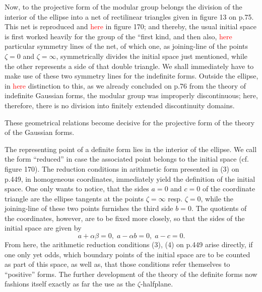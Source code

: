 Now, to the projective form of the modular group belongs the division of the interior of the ellipse into a net of rectilinear triangles given in figure 13 on p.75. This net is reproduced and \textcolor{red}{here} in figure 170; 
and thereby, the usual initial space is first worked heavily for the group of the “first kind, and then also, \textcolor{red}{here} particular symmetry lines of the net, of which one, as joining-line of the points $\zeta=0$ and $\zeta=\infty$, symmetrically divides the initial space just mentioned, while the other represents a side of that double triangle. We shall immediately have to make use of these two symmetry lines for the indefinite forms. Outside the ellipse, in \textcolor{red}{here} distinction to this, as we already concluded on p.76 from the theory of indefinite Gaussian forms, the modular group was improperly discontinuous; here, therefore, there is no division into finitely extended discontinuity domains.

These geometrical relations become decisive for the projective form of the theory of the Gaussian forms. 

The representing point of a definite form lies in the interior of the ellipse. We call the form “reduced” in case the associated point belongs to the initial space (cf. figure 170). The reduction conditions in arithmetic form presented in (3) on p.449, in homogeneous coordinates, immediately yield the definition of the initial space. One only wants to notice, that the sides $a=0$ and $c=0$ of the coordinate triangle are the ellipse tangents at the points $\zeta=\infty$ resp. $\zeta=0$, while the joining-line of these two points furnishes the third side $b=0$. The quotients of the coordinates, however, are to be fixed more closely, so that the sides of the initial space are given by
\begin{equation}
a+\alpha\beta=0,\; a-\alpha b=0,\;a-c=0.
\end{equation}
From here, the arithmetic reduction conditions (3), (4) on p.449 arise directly, if one only yet odds, which boundary points of the initial space are to be counted as part of this space, as well as, that those conditions refer themselves to “positive” forms. The further development of the theory of the definite forms now fashions itself exactly as far the use as the $\zeta$-halfplane.

